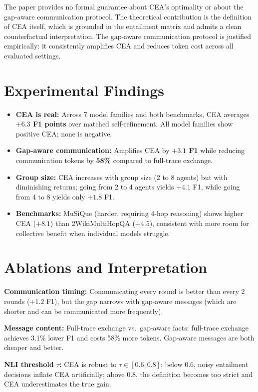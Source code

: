 \documentclass[10pt,twocolumn]{article}
\begin{document}
The paper provides no formal guarantee about CEA's optimality or
about the gap-aware communication protocol. The theoretical
contribution is the definition of CEA itself, which is grounded
in the entailment matrix and admits a clean counterfactual
interpretation. The gap-aware communication protocol is justified
empirically: it consistently amplifies CEA and reduces token cost
across all evaluated settings.

\section{Experimental Findings}

\begin{itemize}[itemsep=2pt,parsep=0pt]
  \item \textbf{CEA is real:} Across 7 model families and both
    benchmarks, CEA averages \textbf{$+6.3$ F1 points}
    over matched self-refinement. All model families show
    positive CEA; none is negative.
  \item \textbf{Gap-aware communication:} Amplifies CEA by
    \textbf{$+3.1$ F1} while reducing communication tokens
    by \textbf{58\%} compared to full-trace exchange.
  \item \textbf{Group size:} CEA increases with group size (2 to 8
    agents) but with diminishing returns; going from 2 to 4 agents
    yields $+4.1$ F1, while going from 4 to 8 yields only $+1.8$ F1.
  \item \textbf{Benchmarks:} MuSiQue (harder, requiring 4-hop
    reasoning) shows higher CEA ($+8.1$) than 2WikiMultiHopQA
    ($+4.5$), consistent with more room for collective benefit when
    individual models struggle.
\end{itemize}

\section{Ablations and Interpretation}

\textbf{Communication timing:} Communicating every round is better
than every 2 rounds ($+1.2$ F1), but the gap narrows with gap-aware
messages (which are shorter and can be communicated more frequently).

\textbf{Message content:} Full-trace exchange vs.\ gap-aware facts:
full-trace exchange achieves 3.1\% lower F1 and costs 58\% more
tokens. Gap-aware messages are both cheaper and better.

\textbf{NLI threshold $\tau$:} CEA is robust to $\tau \in [0.6, 0.8]$;
below 0.6, noisy entailment decisions inflate CEA artificially;
above 0.8, the definition becomes too strict and CEA underestimates
the true gain.
\end{document}
